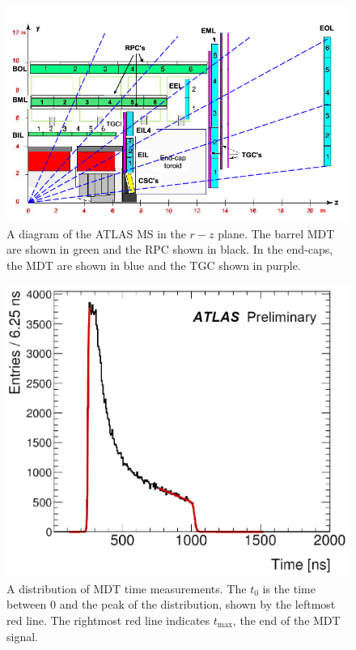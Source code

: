\begin{figure}[htbp]
\centering
\includegraphics[width=.8\textwidth]{figures/Detector/atlas-ms.png}
\caption{A diagram of the \ac{ATLAS} \ac{MS} in the $r-z$ plane. The barrel \ac{MDT} are shown in green and the \ac{RPC} shown in black. In the end-caps, the \ac{MDT} are shown in blue and the \ac{TGC} shown in purple. \cite{ms-vertices}}
\label{fig:atlas-ms}
\end{figure}






\begin{figure}[htbp]
\centering
\includegraphics[width=.8\textwidth]{figures/Detector/mdt-t0.png}
\caption{A distribution of \ac{MDT} time measurements. The $t_{0}$ is the time between 0 and the peak of the distribution, shown by the leftmost red line. The rightmost red line indicates $t_{\textrm{max}}$, the end of the \ac{MDT} signal.}
\label{fig:ms-t0fit}
\end{figure}





